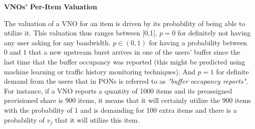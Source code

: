 \begin{Definition}
\textbf{\acp{VNO}' Per-Item Valuation}

The valuation of a \ac{VNO} for an item is driven by its probability of being able to utilize it. This valuation thus ranges between [0,1], $p=0$ for definitely not having any user asking for any bandwidth. $p \in (0,1)$ for having a probability between $0$ and $1$ that a new upstream burst arrives in one of the users' buffer since the last time that the buffer occupancy was reported (this might be predicted using machine learning or traffic history monitoring techniques). And $p=1$ for definite demand from the users that in \acp{PON} is referred to as \textit{"buffer occupancy reports"}. For instance, if a \ac{VNO} reports a quantity of 1000 items and its preassigned provisioned share is 900 items, it means that it will certainly utilize the 900 items with the probability of 1 and is demanding for 100 extra items and there is a probability of $v_j$ that it will utilize this item.
\end{Definition}
